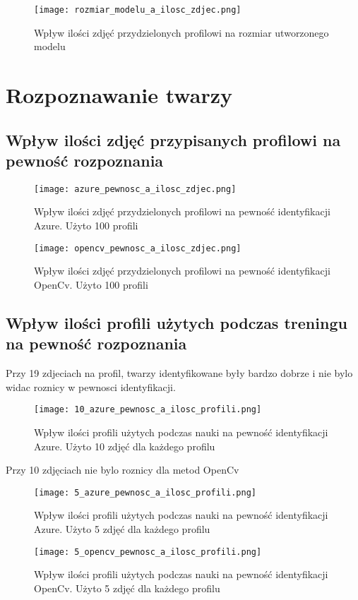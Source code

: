\begin{figure}[H]
	\centering
	\texttt{[image: rozmiar\_modelu\_a\_ilosc\_zdjec.png]}
	\caption{Wpływ ilości zdjęć przydzielonych profilowi na rozmiar utworzonego modelu}
	\label{fig:rozmiar_zdjecia}
\end{figure}

\section{Rozpoznawanie twarzy} \label{b:rozpoznawanie}
\subsection{Wpływ ilości zdjęć przypisanych profilowi na pewność rozpoznania}
\begin{figure}[H]
	\centering
	\texttt{[image: azure\_pewnosc\_a\_ilosc\_zdjec.png]}
	\caption{Wpływ ilości zdjęć przydzielonych profilowi na pewność identyfikacji Azure. Użyto 100 profili}
	\label{fig:azure_zdjecia}
\end{figure}
\begin{figure}[H]
	\centering
	\texttt{[image: opencv\_pewnosc\_a\_ilosc\_zdjec.png]}
	\caption{Wpływ ilości zdjęć przydzielonych profilowi na pewność identyfikacji OpenCv. Użyto 100 profili}
	\label{fig:opencv_zdjecia}
\end{figure}

\subsection{Wpływ ilości profili użytych podczas treningu na pewność rozpoznania}
Przy 19 zdjeciach na profil, twarzy identyfikowane były bardzo dobrze i nie bylo widac roznicy w pewnosci identyfikacji.
\begin{figure}[H]
	\centering
	\texttt{[image: 10\_azure\_pewnosc\_a\_ilosc\_profili.png]}
	\caption{Wpływ ilości profili użytych podczas nauki na pewność identyfikacji Azure. Użyto 10 zdjęć dla każdego profilu}
	\label{fig:azure_10__profile}
\end{figure}
Przy 10 zdjęciach nie bylo roznicy dla metod OpenCv
\begin{figure}[H]
	\centering
	\texttt{[image: 5\_azure\_pewnosc\_a\_ilosc\_profili.png]}
	\caption{Wpływ ilości profili użytych podczas nauki na pewność identyfikacji Azure. Użyto 5 zdjęć dla każdego profilu}
	\label{fig:azure_5__profile}
\end{figure}
\begin{figure}[H]
	\centering
	\texttt{[image: 5\_opencv\_pewnosc\_a\_ilosc\_profili.png]}
	\caption{Wpływ ilości profili użytych podczas nauki na pewność identyfikacji OpenCv. Użyto 5 zdjęć dla każdego profilu}
	\label{fig:azure_5__profile}
\end{figure}

